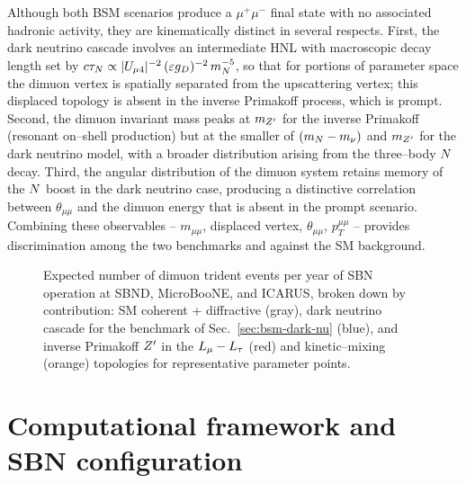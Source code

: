 Although both BSM scenarios produce a $\mu^+\mu^-$ final state with no
associated hadronic activity, they are kinematically distinct in
several respects.  First, the dark neutrino cascade involves an
intermediate HNL with macroscopic decay length set by
$c\tau_N \propto |U_{\mu 4}|^{-2}\,(\varepsilon g_D)^{-2}\,m_N^{-5}$, so
that for portions of parameter space the dimuon vertex is
spatially separated from the upscattering vertex; this displaced
topology is absent in the inverse Primakoff process, which is
prompt.  Second, the dimuon invariant mass peaks at $m_{Z^{\prime}}$ for the
inverse Primakoff (resonant on--shell production) but at the smaller
of $(m_N - m_\nu)$ and $m_{Z^{\prime}}$ for the dark neutrino model, with a
broader distribution arising from the three--body $N$ decay.
Third, the angular distribution of the dimuon system retains memory
of the $N$ boost in the dark neutrino case, producing a
distinctive correlation between $\theta_{\mu\mu}$ and the dimuon
energy that is absent in the prompt scenario.  Combining these
observables -- $m_{\mu\mu}$, displaced vertex, $\theta_{\mu\mu}$,
$p_T^{\mu\mu}$ -- provides discrimination among the two benchmarks
and against the SM background.

\begin{figure}[t]
  \centering
  \caption{Expected number of dimuon trident events per year of SBN
    operation at SBND, MicroBooNE, and ICARUS, broken down by
    contribution: SM coherent + diffractive (gray), dark neutrino
    cascade for the benchmark of Sec.~\ref{sec:bsm-dark-nu} (blue),
    and inverse Primakoff $Z^{\prime}$ in the $L_\mu - L_\tau$ (red) and
    kinetic--mixing (orange) topologies for representative parameter
    points.}
  \label{fig:rates}
\end{figure}

\section{Computational framework and SBN configuration}\label{sec:framework}

